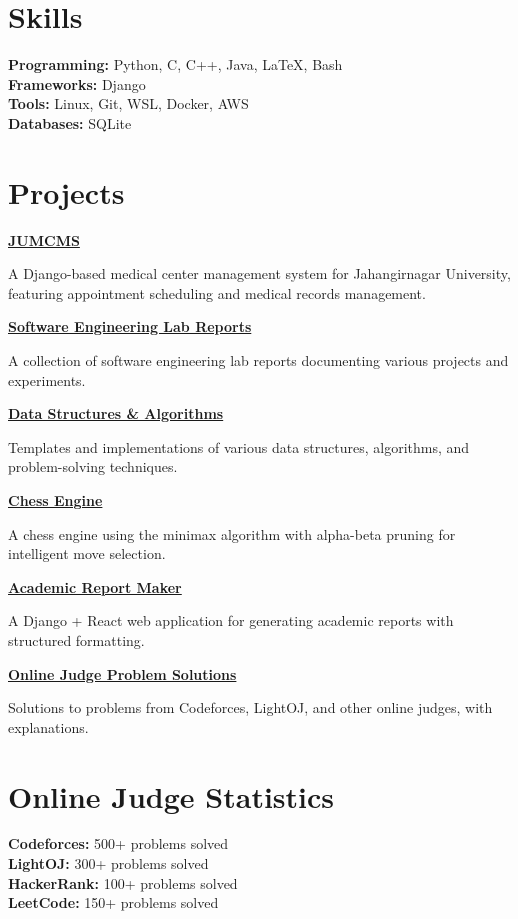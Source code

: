 \documentclass[a4paper,10pt]{article}
\begin{document}
\section*{Skills}

\textbf{Programming:} Python, C, C++, Java, LaTeX, Bash \\
\textbf{Frameworks:} Django \\
\textbf{Tools:} Linux, Git, WSL, Docker, AWS \\
\textbf{Databases:} SQLite


\section*{Projects}
\href{https://github.com/sudiptarathi2020/JUMCMS-Jahangirnagar-University-Medical-Center-Management-System.git}{\textbf{JUMCMS}}
\begin{boxB}
    A Django-based medical center management system for Jahangirnagar University, featuring appointment scheduling and medical records management.
\end{boxB}


\href{https://github.com/sudiptarathi2020/Software-Engineering-Lab-CSE404-Reports.git}{\textbf{Software Engineering Lab Reports}}
\begin{boxB}
A collection of software engineering lab reports documenting various projects and experiments.
\end{boxB}
\href{https://github.com/sudiptarathi2020/Data-structures-and-Algorithms.git}{\textbf{Data Structures \& Algorithms}}
\begin{boxB}
Templates and implementations of various data structures, algorithms, and problem-solving techniques.
\end{boxB}
\href{https://github.com/sudiptarathi2020/Simple-Chess-Engine.git}{\textbf{Chess Engine}}
\begin{boxB}
A chess engine using the minimax algorithm with alpha-beta pruning for intelligent move selection.
\end{boxB}
\href{https://github.com/sudiptarathi2020/academic-report-maker.git}{\textbf{Academic Report Maker}}
\begin{boxB}
A Django + React web application for generating academic reports with structured formatting.
\end{boxB}
\href{https://github.com/sudiptarathi2020/Problem-Solves.git}{\textbf{Online Judge Problem Solutions}}
\begin{boxB}
Solutions to problems from Codeforces, LightOJ, and other online judges, with explanations.
\end{boxB}

\section*{Online Judge Statistics}
\begin{multicols}{2}
\textbf{Codeforces:} 500+ problems solved \\
\textbf{LightOJ:} 300+ problems solved \\
\textbf{HackerRank:} 100+ problems solved \\
\textbf{LeetCode:} 150+ problems solved
\end{multicols}
\end{document}
